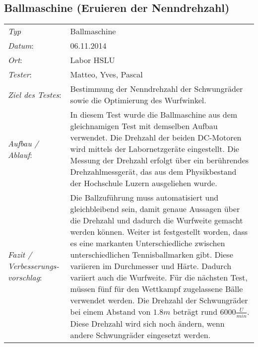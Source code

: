 \subsection{Ballmaschine (Eruieren der Nenndrehzahl)}

\begin{tabular}{p{3.6cm}p{\textwidth-3.6cm-0.7cm}}
\rule{0pt}{11pt}\textit{Typ}              & Ballmaschine \\ 
\rule{0pt}{11pt}\textit{Datum}:           & 06.11.2014   \\
\rule{0pt}{11pt}\textit{Ort}:             & Labor HSLU \\
\rule{0pt}{11pt}\textit{Tester}:          & Matteo, Yves, Pascal\\
\rule{0pt}{11pt}\textit{Ziel des Testes}: & Bestimmung der Nenndrehzahl der 
Schwungräder sowie die Optimierung des Wurfwinkel.  \\
\rule{0pt}{11pt}\textit{Aufbau / Ablauf}: & In diesem Test wurde die Ballmaschine 
aus dem gleichnamigen Test mit demselben Aufbau verwendet. Die Drehzahl der beiden DC-Motoren
wird mittels der Labornetzgeräte eingestellt. Die Messung der Drehzahl erfolgt über ein berührendes 
Drehzahlmessgerät, das aus dem Physikbestand der Hochschule Luzern ausgeliehen wurde.\\
\rule{0pt}{11pt}\textit{Fazit / Verbesserungs-\newline vorschlag}: & Die Ballzuführung 
muss automatisiert und gleichbleibend sein, damit genaue Aussagen über die Drehzahl 
und dadurch die Wurfweite gemacht werden können. Weiter ist festgestellt worden, dass 
es eine markanten Unterschiedliche zwischen unterschiedlichen Tennisballmarken gibt. 
Diese variieren im Durchmesser und Härte. Dadurch variiert auch die Wurfweite. Für 
die nächsten Test, müssen fünf für den Wettkampf zugelassene Bälle verwendet werden. 
Die Drehzahl der Schwungräder bei einem Abstand von $1.8 m$ beträgt rund 
$6000\frac{U}{min}$. Diese Drehzahl wird sich noch ändern, wenn andere Schwungräder 
eingesetzt werden.
\end{tabular}
